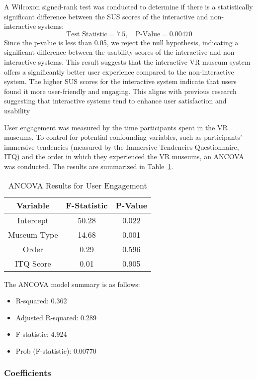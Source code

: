 \documentclass[conference]{IEEEtran}
\begin{document}
A Wilcoxon signed-rank test was conducted to determine if there is a statistically significant difference between the SUS scores of the interactive and non-interactive systems:
\[
\text{Test Statistic} = 7.5, \quad \text{P-Value} = 0.00470
\]
Since the p-value is less than 0.05, we reject the null hypothesis, indicating a significant
difference between the usability scores of the interactive and non-interactive systems. This result suggests that the interactive VR museum system offers a significantly better user experience compared to the non-interactive system. The higher SUS scores for the interactive system indicate that users found it more user-friendly and engaging. This aligns with previous research suggesting that interactive systems tend to enhance user satisfaction and usability

User engagement was measured by the time participants spent in the VR museums. To control for potential confounding variables, such as participants' immersive tendencies (measured by the Immersive Tendencies Questionnaire, ITQ) and the order in which they experienced the VR museums, an ANCOVA was conducted. The results are summarized in Table~\ref{tab:ancova}.

\begin{table}[h]
\centering
\caption{ANCOVA Results for User Engagement}
\begin{tabular}{|c|c|c|}
\hline
\textbf{Variable} & \textbf{F-Statistic} & \textbf{P-Value} \\
\hline
Intercept & 50.28 & 0.022 \\
Museum Type & 14.68 & 0.001 \\
Order & 0.29 & 0.596 \\
ITQ Score & 0.01 & 0.905 \\
\hline
\end{tabular}
\label{tab:ancova}
\end{table}

\noindent The ANCOVA model summary is as follows:

\begin{itemize}
    \item R-squared: 0.362
    \item Adjusted R-squared: 0.289
    \item F-statistic: 4.924
    \item Prob (F-statistic): 0.00770
\end{itemize}

\subsubsection*{Coefficients}
\end{document}
